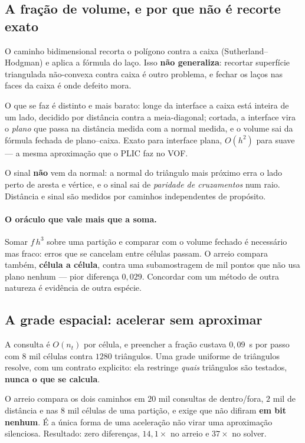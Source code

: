 \subsection{A fra\c{c}\~ao de volume, e por que n\~ao \'e recorte exato}

O caminho bidimensional recorta o pol\'igono contra a caixa
(Sutherland--Hodgman) e aplica a f\'ormula do la\c{c}o. Isso \textbf{n\~ao
generaliza}: recortar superf\'icie triangulada n\~ao-convexa contra caixa \'e
outro problema, e fechar os la\c{c}os nas faces da caixa \'e onde defeito mora.

O que se faz \'e distinto e mais barato: longe da interface a caixa est\'a
inteira de um lado, decidido por dist\^ancia contra a meia-diagonal; cortada, a
interface vira o \emph{plano} que passa na dist\^ancia medida com a normal
medida, e o volume sai da f\'ormula fechada de plano--caixa. Exato para
interface plana, $O(h^2)$ para suave --- a mesma aproxima\c{c}\~ao que o PLIC faz
no VOF.

O sinal \textbf{n\~ao} vem da normal: a normal do tri\^angulo mais pr\'oximo erra
o lado perto de aresta e v\'ertice, e o sinal sai de \emph{paridade de
cruzamentos} num raio. Dist\^ancia e sinal s\~ao medidos por caminhos
independentes de prop\'osito.

\paragraph{O or\'aculo que vale mais que a soma.} Somar $f\,h^3$ sobre uma
parti\c{c}\~ao e comparar com o volume fechado \'e necess\'ario mas fraco: erros
que se cancelam entre c\'elulas passam. O arreio compara tamb\'em, \textbf{c\'elula
a c\'elula}, contra uma subamostragem de mil pontos que n\~ao usa plano nenhum
--- pior diferen\c{c}a $0{,}029$. Concordar com um m\'etodo de outra natureza \'e
evid\^encia de outra esp\'ecie.

\subsection{A grade espacial: acelerar sem aproximar}

A consulta \'e $O(n_t)$ por c\'elula, e preencher a fra\c{c}\~ao custava
$0{,}09$~s por passo com $8$ mil c\'elulas contra $1280$ tri\^angulos. Uma grade
uniforme de tri\^angulos resolve, com um contrato explicito: ela restringe
\emph{quais} tri\^angulos s\~ao testados, \textbf{nunca o que se calcula}.

O arreio compara os dois caminhos em $20$ mil consultas de dentro/fora, $2$ mil
de dist\^ancia e nas $8$ mil c\'elulas de uma parti\c{c}\~ao, e exige que n\~ao
difiram \textbf{em bit nenhum}. \'E a \'unica forma de uma acelera\c{c}\~ao n\~ao
virar uma aproxima\c{c}\~ao silenciosa. Resultado: zero diferen\c{c}as, $14{,}1\times$
no arreio e $37\times$ no solver.

